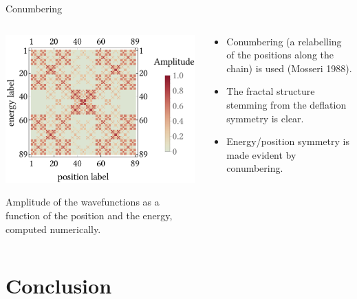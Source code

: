 \documentclass[xcolor=x11names,compress,professionalfonts]{beamer}
\renewcommand{\(}{\begin{columns}}
\renewcommand{\)}{\end{columns}}
\newcommand{\<}[1]{\begin{column}{#1}}
\renewcommand{\>}{\end{column}}
\begin{document}
\begin{frame}{Conumbering}
\begin{columns}
	\begin{column}{7cm}
		\centering
		\includegraphics[scale=.55]{ldos_reordered.pdf}
		
		\scriptsize{Amplitude of the wavefunctions as a function of the position and the energy, computed numerically.}	
	\end{column}
	\begin{column}{5cm}
		\begin{itemize}
			\item Conumbering (a relabelling of the positions along the chain) is used (Mosseri 1988).
			\item The fractal structure stemming from the deflation symmetry is clear.
			\item Energy/position symmetry is made evident by conumbering.
		\end{itemize}
	\end{column}
\end{columns}
\end{frame}

\section{Conclusion}
\end{document}
